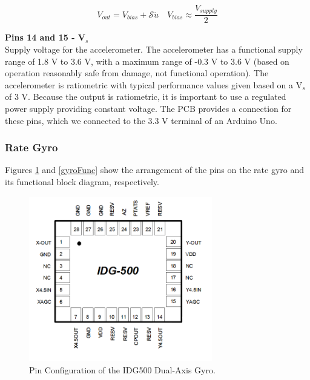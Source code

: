 \documentclass{article}
\theoremstyle{plain}
\theoremstyle{definition}
\theoremstyle{remark}
\newcommand{\Sens}{\mathcal{S}}
\begin{document}
\begin{equation}
V_{out} = V_{bias} + \Sens \ddot{u} \quad V_{bias} \approx \frac{V_{supply}}{2}
\label{Accel_EQ}
\end{equation}

\textbf{Pins 14 and 15 - V$_s$}\\
Supply voltage for the accelerometer. The accelerometer has a functional supply range of 1.8 V to 3.6 V, with a maximum range of -0.3 V to 3.6 V (based on operation reasonably safe from damage, not functional operation). The accelerometer is ratiometric with typical performance values given based on a V$_s$ of 3 V. Because the output is ratiometric, it is important to use a regulated power supply providing constant voltage. The PCB provides a connection for these pins, which we connected to the 3.3 V terminal of an Arduino Uno.\\ 

\subsubsection{Rate Gyro}
Figures \ref{gyroPins} and \ref{gyroFunc} show the arrangement of the pins on the rate gyro and its functional block diagram, respectively. \\

\begin{figure}[hbt]
\begin{center}
\includegraphics[width = 8cm]{IDG500Pins.png}
\caption{Pin Configuration of the IDG500 Dual-Axis Gyro.}
\label{gyroPins}
\end{center}
\end{figure}
\end{document}
